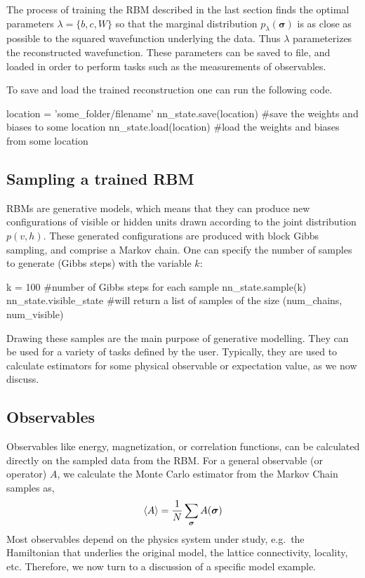 \documentclass[submission, Phys]{SciPost}
\begin{document}
The process of training the RBM described in the last section finds the optimal parameters $\lambda = \{b,c,W\}$ so that 
the marginal distribution $p_{\lambda} ( \bm{\sigma})$ is as close as possible to the squared wavefunction underlying the data.
Thus $\lambda$ parameterizes the reconstructed wavefunction.  These parameters can be saved to file, and loaded in order to perform tasks such as the measurements of observables.

To save and load the trained reconstruction one can run the following code.

\begin{python}
location = 'some_folder/filename'
nn_state.save(location) #save the weights and biases to some location
nn_state.load(location) #load the weights and biases from some location
\end{python}


\subsection{Sampling a trained RBM}

RBMs are generative models, which means that they can produce new configurations of visible or hidden units drawn according 
to the joint distribution $p(v,h)$.  These generated configurations are produced with block Gibbs sampling, and comprise a Markov chain.  One can specify the number of samples to generate (Gibbs steps) with the variable $k$:
\begin{python}
k = 100 #number of Gibbs steps for each sample
nn_state.sample(k)
nn_state.visible_state #will return a list of samples of the size (num_chains, num_visible)
\end{python}
Drawing these samples are the main purpose of generative modelling.  They can be used for a variety of tasks defined by the user.  Typically, they are used to calculate estimators for some physical observable or expectation value, as we now discuss.

\subsection{Observables}
\label{Sec:Observables}

Observables like energy, magnetization, or correlation functions, can be calculated directly on the sampled data from the RBM. 
For a general observable (or operator) $A$, we calculate the Monte Carlo estimator from the Markov Chain samples as,
\begin{equation}
\braket{A} = \frac{1}{N} \sum_{\bm{\sigma}} A(\bm{\sigma})
\end{equation}
Most observables depend on the physics system under study, e.g.~the Hamiltonian that underlies the original model, the lattice connectivity, locality, etc.  Therefore, we now turn to a discussion of a specific model example.
\end{document}
